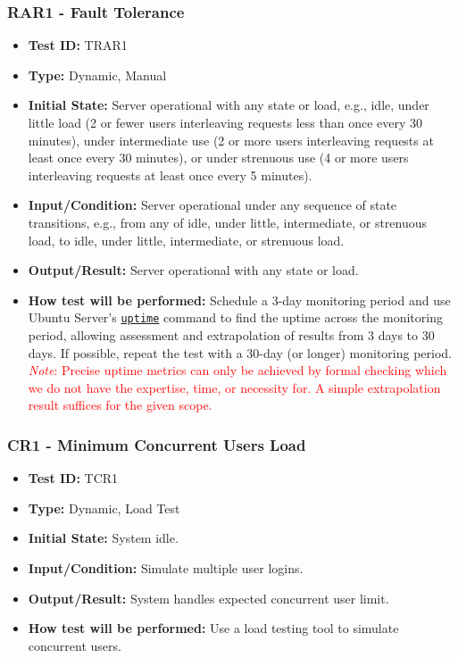 \documentclass[12pt, titlepage]{article}
\begin{document}
\subsubsection{RAR1 - Fault Tolerance}
\begin{itemize}
    \item \textbf{Test ID:} TRAR1
    \item \textbf{Type:} Dynamic, Manual
    \item \textbf{Initial State:} Server operational with any state or load, e.g., idle, under little load (2 or fewer users interleaving requests less than once every 30 minutes), under intermediate use (2 or more users interleaving requests at least once every 30 minutes), or under strenuous use (4 or more users interleaving requests at least once every 5 minutes).
    \item \textbf{Input/Condition:} Server operational under any sequence of state transitions, e.g., from any of idle, under little, intermediate, or strenuous load, to idle, under little, intermediate, or strenuous load.
    \item \textbf{Output/Result:} Server operational with any state or load.
    \item \textbf{How test will be performed:} Schedule a 3-day monitoring period and use Ubuntu Server's \href{https://manpages.ubuntu.com/manpages/xenial/man1/uptime.1.html}{\texttt{uptime}} command to find the uptime across the monitoring period, allowing assessment and extrapolation of results from 3 days to 30 days. If possible, repeat the test with a 30-day (or longer) monitoring period. \textcolor{red}{\emph{Note}: Precise uptime metrics can only be achieved by formal checking which we do not have the expertise, time, or necessity for. A simple extrapolation result suffices for the given scope.}
\end{itemize}

\subsubsection{CR1 - Minimum Concurrent Users Load}
\begin{itemize}
    \item \textbf{Test ID:} TCR1
    \item \textbf{Type:} Dynamic, Load Test
    \item \textbf{Initial State:} System idle.
    \item \textbf{Input/Condition:} Simulate multiple user logins.
    \item \textbf{Output/Result:} System handles expected concurrent user limit.
    \item \textbf{How test will be performed:} Use a load testing tool to simulate concurrent users.
\end{itemize}
\end{document}
